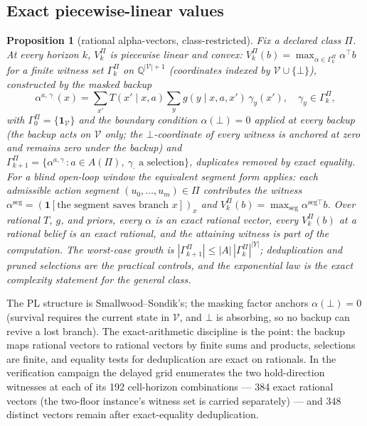 \documentclass[10pt,twocolumn]{article}
\theoremstyle{plain}
\newtheorem{proposition}[theorem]{Proposition}
\theoremstyle{definition}
\theoremstyle{remark}
\begin{document}
\subsection{Exact piecewise-linear values}\label{exact}

\begin{proposition}[rational alpha-vectors, class-restricted]\label{prop:pl}
Fix a declared class \(\Pi\). At every horizon \(k\),
\(V^{\Pi}_{k}\) is piecewise linear and convex:
\(V^{\Pi}_{k}(b) = \max_{\alpha \in \Gamma^{\Pi}_{k}} \alpha^{\top} b\)
for a finite witness set \(\Gamma^{\Pi}_{k}\) on
\(\mathbb{Q}^{|\mathcal{V}|+1}\) (coordinates indexed by
\(\mathcal{V} \cup \{\bot\}\)), constructed by the masked backup
\[
\alpha^{a,\,\gamma_{\cdot}}(x) =
\sum_{x'} T(x' \mid x, a) \sum_{y} g(y \mid x, a, x')\, \gamma_{y}(x'),\quad
\gamma_{y} \in \Gamma^{\Pi}_{k},
\]
with \(\Gamma^{\Pi}_{0} = \{ \mathbf{1}_{\mathcal{V}} \}\) and the
boundary condition \(\alpha(\bot) = 0\) applied at every backup (the
backup acts on \(\mathcal{V}\) only; the \(\bot\)-coordinate of every
witness is anchored at zero and remains zero under the backup) and
\(\Gamma^{\Pi}_{k+1} = \{ \alpha^{a, \gamma_{\cdot}} : a \in A(\Pi),\
\gamma_{\cdot} \text{ a selection} \}\), duplicates removed by exact
equality. For a blind open-loop window the equivalent segment form
applies: each admissible action segment \((u_{0}, \dots, u_{m}) \in \Pi\)
contributes the witness
\(\alpha^{\mathrm{seg}} = (\mathbf{1}[\text{the segment saves branch } x])_{x}\)
and \(V^{\Pi}_{k}(b) = \max_{\mathrm{seg}} \alpha^{\mathrm{seg}\top} b\).
Over rational \(T\), \(g\), and priors, every \(\alpha\) is an exact
rational vector, every \(V^{\Pi}_{k}(b)\) at a rational belief is an exact
rational, and the attaining witness is part of the computation. The
worst-case growth is
\(|\Gamma^{\Pi}_{k+1}| \le |A|\,|\Gamma^{\Pi}_{k}|^{|Y|}\);
deduplication and pruned selections are the practical controls, and the
exponential law is the exact complexity statement for the general class.
\end{proposition}

The PL structure is Smallwood--Sondik's; the masking factor anchors
\(\alpha(\bot) = 0\) (survival requires the current state in
\(\mathcal{V}\), and \(\bot\) is absorbing, so no backup can revive a lost
branch). The exact-arithmetic discipline is the point: the backup maps
rational vectors to rational vectors by finite sums and products,
selections are finite, and equality tests for deduplication are exact on
rationals. In the verification campaign the delayed grid enumerates the two
hold-direction witnesses at each of its 192 cell-horizon combinations ---
384 exact rational vectors (the two-floor instance's witness set is
carried separately) --- and 348 distinct vectors remain after
exact-equality deduplication.
\end{document}
